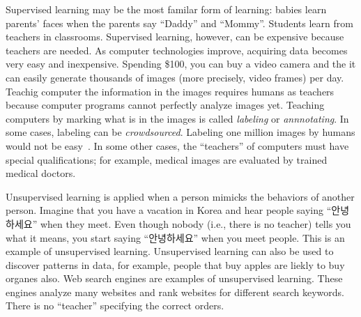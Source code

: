Supervised learning may be the most familar form of learning: babies
learn parents' faces when the parents say ``Daddy'' and ``Mommy''.
Students learn from teachers in classrooms.  Supervised learning,
however, can be expensive because teachers are needed.  As computer
technologies improve, acquiring data becomes very easy and
inexpensive.  Spending \$100, you can buy a video camera and the it
can easily generate thousands of images (more precisely, video frames)
per day. Teachig computer the information in the images requires
humans as teachers because computer programs cannot perfectly analyze
images yet.  Teaching computers by marking what is in the images is
called {\it labeling} or {\it annnotating}.  In some cases, labeling
can be {\it crowdsourced}.  Labeling one million images by humans
would not be easy~\cite{Russakovsky2015ImageNetLargeScale211252}.
 In some other cases, the ``teachers'' of
computers must have special qualifications; for example, medical
images are evaluated by trained medical doctors.

Unsupervised learning is applied when a person mimicks the behaviors
of another person.  Imagine that you have a vacation in Korea and hear
people saying ``안녕하세요'' when they meet.  Even though nobody
(i.e., there is no teacher) tells you what it means, you start saying
``안녕하세요'' when you meet people.  This is an example of
unsupervised learning.  Unsupervised learning can also be used to
discover patterns in data, for example, people that buy apples are
liekly to buy organes also.  Web search engines are examples of
unsupervised learning.  These engines analyze many websites and rank
websites for different search keywords. There is no ``teacher''
specifying the correct orders.


 


\begin{comment}
\vspace{0.1in}
\begin{table}
  \caption{Four types of learning}
  \begin{tabular}{p{1in}p{1in}p{1in}p{1in}p{1in}}
    &    {\bf Supervised} & {\bf Unsupervised} & {\bf Reinforcement} & {\bf Transfer}\\
    \hline
    Teacher & Yes & No & No \\
    Correct Answer & Yes & No & No \\
    Consider Sequences & No & No & Yes \\
    Applications & Answer Yes/No & Cluster data & Develop strategies \\
  \end{tabular}

  \label{table:threetypesoflearning}
\end{table}
\vspace{0.1in}

\end{comment}


